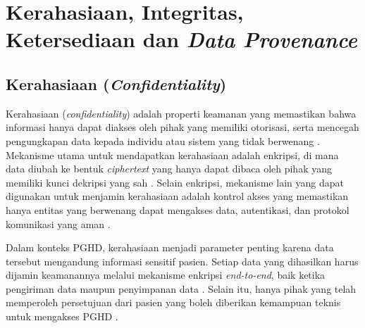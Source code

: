 
\section{Kerahasiaan, Integritas, Ketersediaan dan \textit{Data Provenance}}\label{studi-cia-provenance}

\subsection{Kerahasiaan (\textit{Confidentiality})}\label{studi-confidentiality}
Kerahasiaan (\textit{confidentiality}) adalah properti keamanan yang memastikan bahwa informasi hanya dapat diakses oleh pihak yang memiliki otorisasi, serta mencegah pengungkapan data kepada individu atau sistem yang tidak berwenang \parencite{tripathi2025cia}. 
Mekanisme utama untuk mendapatkan kerahasiaan adalah enkripsi, di mana data diubah ke bentuk \textit{ciphertext} yang hanya dapat dibaca oleh pihak yang memiliki kunci dekripsi yang sah \parencite{gowthamani_edgecrypto_2025}.
Selain enkripsi, mekanisme lain yang dapat digunakan untuk menjamin kerahasiaan adalah kontrol akses yang memastikan hanya entitas yang berwenang dapat mengakses data, autentikasi, dan protokol komunikasi yang aman \parencite{tripathi2025cia}. %


Dalam konteks PGHD, kerahasiaan menjadi parameter penting karena data tersebut mengandung informasi sensitif pasien.
Setiap data yang dihasilkan harus dijamin keamanannya melalui mekanisme enkripsi \textit{end-to-end}, baik ketika pengiriman data maupun penyimpanan data \parencite{Khatiwada_Yang_Lin_Blobel_2024_PGHD_Understanding}. 
Selain itu, hanya pihak yang telah memperoleh persetujuan dari pasien yang boleh diberikan kemampuan teknis untuk mengakses PGHD \parencite{Khatiwada_Yang_Lin_Blobel_2024_PGHD_Understanding}.


